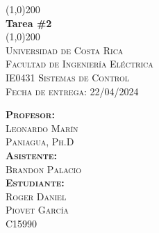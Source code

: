 \begin{titlepage}    
    \begin{center}
        \line(1,0){200}\\
        [5mm]
        \huge{\bfseries Tarea \#2}\\
        \line(1,0){200}\\
        [2.5cm]
        \textsc{\Large Universidad de Costa Rica\\Facultad de Ingeniería Eléctrica\\IE0431 Sistemas de Control}\\
        \textsc{\Large Fecha de entrega: 22/04/2024}\\
        \vspace{2.5cm}
        \begin{flushleft}
            \textsc{\large 
            \textbf{Profesor:}\\ Leonardo Marín\\ Paniagua, Ph.D\\[2mm]
            \textbf{Asistente:}\\ Brandon Palacio\\[2mm]
            \textbf{Estudiante:}\\ Roger Daniel\\Piovet García\\[2mm]C15990\\}
        \end{flushleft}
    \end{center}
\end{titlepage}
\restoregeometry
